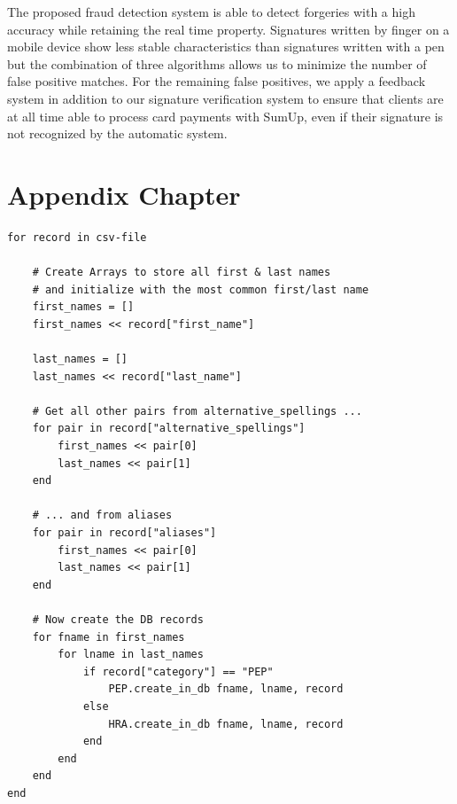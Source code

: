 \documentclass[a4paper, oneside]{csthesis}
\begin{document}
The proposed fraud detection system is able to detect forgeries with a high accuracy while retaining the real time property. Signatures written by finger on a mobile device show less stable characteristics than signatures written with a pen but the combination of three algorithms allows us to minimize the number of false positive matches. For the remaining false positives, we apply a feedback system in addition to our signature verification system to ensure that clients are at all time able to process card payments with SumUp, even if their signature is not recognized by the automatic system.







\appendix
\chapter{Appendix Chapter}

\begin{lstlisting}[caption={The Algorithm that parses the csv file creates a separate DB record for each first/last name pair},label={lst:world-check-parse}]
for record in csv-file

    # Create Arrays to store all first & last names
    # and initialize with the most common first/last name
    first_names = []
    first_names << record["first_name"]

    last_names = []
    last_names << record["last_name"]

    # Get all other pairs from alternative_spellings ...
    for pair in record["alternative_spellings"]
        first_names << pair[0]
        last_names << pair[1]
    end

    # ... and from aliases
    for pair in record["aliases"]
        first_names << pair[0]
        last_names << pair[1]
    end

    # Now create the DB records
    for fname in first_names
        for lname in last_names
            if record["category"] == "PEP"
                PEP.create_in_db fname, lname, record
            else
                HRA.create_in_db fname, lname, record
            end
        end
    end
end
\end{lstlisting}
\end{document}
